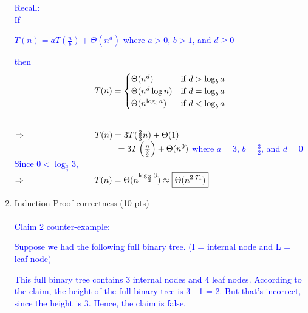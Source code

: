 \documentclass[11pt]{article}
\begin{document}
\begin{enumerate}
\textcolor{blue}{Recall:\\ \-\hspace{2cm} If\begin{center} ${T(n) = aT(\frac{n}{b}) + \Theta(n^d)}$ where ${a > 0}$, ${b > 1}$, and ${d \geq 0}$\\
\end{center} \-\hspace{2cm}
then\[ T(n) =\begin{cases} \Theta(n^d)&\text{if $ $$d > \log_b a$$ $}\\ \Theta(n^d \log n)&\text{if $ $$d = \log_b a$$ $}\\ \Theta(n^{\log_b a})&\text{if $ $$d < \log_b a$$ $}\end{cases}\]}\\
\textcolor{blue}{
${ \Rightarrow \-\hspace{2.85cm} T(n) = 3T(\frac{2}{3}n)+\Theta(1)}$ \\ ${ \-\hspace{4.28cm}= 3T \left(\frac{n}{\frac{3}{2}}\right)+\Theta(n^0)}$  where ${a = 3}$, ${b = \frac{3}{2}}$, and ${d = 0}$ \\ 
\-\hspace{2cm} Since ${0 < \log_\frac{3}{2} 3}$,\\
${ \Rightarrow \-\hspace{2.85cm} T(n) = \Theta(n^{\log_\frac{3}{2} 3}) \approx \boxed{\Theta(n^{2.71})}}$
}

\item Induction Proof correctness (10 pts)\\
\- \\
\textcolor{blue}{\underline{Claim 2 counter-example:}}


\textcolor{blue}{ Suppose we had the following full binary tree. (I = internal node and L = leaf node)
\begin{center}
\end{center}
This full binary tree contains 3 internal nodes and 4 leaf nodes. According to the claim, the height of the full binary tree is 3 - 1 = 2. But that's incorrect, since the height is 3. Hence, the claim is false.}


\end{enumerate}
\end{document}
